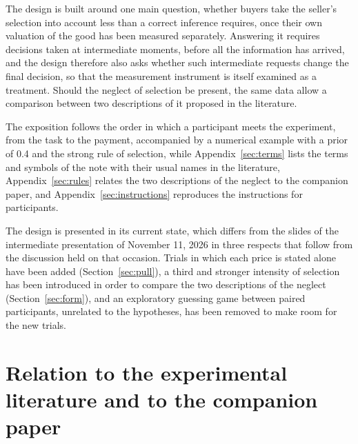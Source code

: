 \documentclass[11pt,a4paper]{article}
\begin{document}
The design is built around one main question, whether buyers take the seller's selection into account less than a correct inference requires, once their own valuation of the good has been measured separately. Answering it requires decisions taken at intermediate moments, before all the information has arrived, and the design therefore also asks whether such intermediate requests change the final decision, so that the measurement instrument is itself examined as a treatment. Should the neglect of selection be present, the same data allow a comparison between two descriptions of it proposed in the literature.

The exposition follows the order in which a participant meets the experiment, from the task to the payment, accompanied by a numerical example with a prior of 0.4 and the strong rule of selection, while Appendix~\ref{sec:terms} lists the terms and symbols of the note with their usual names in the literature, Appendix~\ref{sec:rules} relates the two descriptions of the neglect to the companion paper, and Appendix~\ref{sec:instructions} reproduces the instructions for participants.

The design is presented in its current state, which differs from the slides of the intermediate presentation of November 11, 2026 in three respects that follow from the discussion held on that occasion. Trials in which each price is stated alone have been added (Section~\ref{sec:pull}), a third and stronger intensity of selection has been introduced in order to compare the two descriptions of the neglect (Section~\ref{sec:form}), and an exploratory guessing game between paired participants, unrelated to the hypotheses, has been removed to make room for the new trials.

\section{Relation to the experimental literature and to the companion paper}
\end{document}
